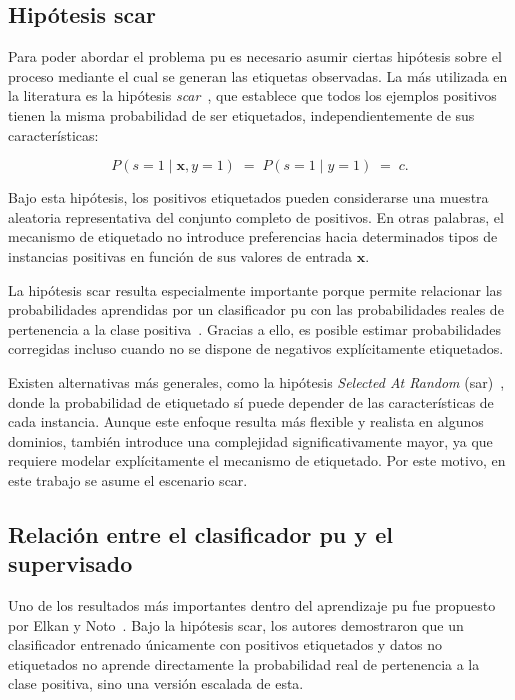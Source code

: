 \subsection{Hipótesis \acrshort{scar}}
\label{subsec:scar}

Para poder abordar el problema \acrshort{pu} es necesario asumir ciertas hipótesis sobre el proceso mediante el cual se generan las etiquetas observadas. La más utilizada en la literatura es la hipótesis \textit{\acrfull{scar}}~\cite{elkan2008learning, bekker2020learning}, que establece que todos los ejemplos positivos tienen la misma probabilidad de ser etiquetados, independientemente de sus características:

\begin{equation}
  P(s=1 \mid \mathbf{x}, y=1) \;=\; P(s=1 \mid y=1) \;=\; c.
  \label{eq:scar}
\end{equation}

Bajo esta hipótesis, los positivos etiquetados pueden considerarse una muestra aleatoria representativa del conjunto completo de positivos. En otras palabras, el mecanismo de etiquetado no introduce preferencias hacia determinados tipos de instancias positivas en función de sus valores de entrada $\mathbf{x}$.

La hipótesis \acrshort{scar} resulta especialmente importante porque permite relacionar las probabilidades aprendidas por un clasificador \acrshort{pu} con las probabilidades reales de pertenencia a la clase positiva~\cite{elkan2008learning}. Gracias a ello, es posible estimar probabilidades corregidas incluso cuando no se dispone de negativos explícitamente etiquetados.

Existen alternativas más generales, como la hipótesis \textit{Selected At Random} (\acrshort{sar})~\cite{bekker2020learning}, donde la probabilidad de etiquetado sí puede depender de las características de cada instancia. Aunque este enfoque resulta más flexible y realista en algunos dominios, también introduce una complejidad significativamente mayor, ya que requiere modelar explícitamente el mecanismo de etiquetado. Por este motivo, en este trabajo se asume el escenario \acrshort{scar}.

\subsection{Relación entre el clasificador \acrshort{pu} y el supervisado}
\label{subsec:elkan_noto}

Uno de los resultados más importantes dentro del aprendizaje \acrshort{pu} fue propuesto por Elkan y Noto~\cite{elkan2008learning}. Bajo la hipótesis \acrshort{scar}, los autores demostraron que un clasificador entrenado únicamente con positivos etiquetados y datos no etiquetados no aprende directamente la probabilidad real de pertenencia a la clase positiva, sino una versión escalada de esta.

